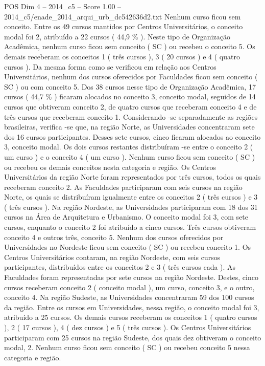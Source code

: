 \begin{textsample}{POS Dim 4 – 2014\_c5 – Score 1.00 – 2014\_c5/enade\_2014\_arqui\_urb\_dc542636d2.txt}
Nenhum curso ficou sem conceito.
Entre os 49 cursos mantidos por Centros Universitários, o conceito modal foi 2, atribuído a 22 cursos ( 44,9 \% ).
Neste tipo de Organização Acadêmica, nenhum curso ficou sem conceito ( SC ) ou recebeu o conceito 5.
Os demais receberam os conceitos 1 ( três cursos ), 3 ( 20 cursos ) e 4 ( quatro cursos ).
Da mesma forma como se verificou em relação aos Centros Universitários, nenhum dos cursos oferecidos por Faculdades ficou sem conceito ( SC ) ou com conceito 5.
Dos 38 cursos nesse tipo de Organização Acadêmica, 17 cursos ( 44,7 \% ) ficaram alocados no conceito 3, conceito modal, seguidos de 14 cursos que obtiveram conceito 2, de quatro cursos que receberam conceito 4 e de três cursos que receberam conceito 1.
Considerando -se separadamente as regiões brasileiras, verifica -se que, na região Norte, as Universidades concentraram sete dos 16 cursos participantes.
Desses sete cursos, cinco ficaram alocados ao conceito 3, conceito modal.
Os dois cursos restantes distribuíram -se entre o conceito 2 ( um curso ) e o conceito 4 ( um curso ).
Nenhum curso ficou sem conceito ( SC ) ou recebeu os demais conceitos nesta categoria e região.
Os Centros Universitários da região Norte foram representados por três cursos, todos os quais receberam conceito 2.
As Faculdades participaram com seis cursos na região Norte, os quais se distribuíram igualmente entre os conceitos 2 ( três cursos ) e 3 ( três cursos ).
Na região Nordeste, as Universidades participaram com 18 dos 31 cursos na Área de Arquitetura e Urbanismo.
O conceito modal foi 3, com sete cursos, enquanto o conceito 2 foi atribuído a cinco cursos.
Três cursos obtiveram conceito 4 e outros três, conceito 5.
Nenhum dos cursos oferecidos por Universidades no Nordeste ficou sem conceito ( SC ) ou recebeu conceito 1.
Os Centros Universitários contaram, na região Nordeste, com seis cursos participantes, distribuídos entre os conceitos 2 e 3 ( três cursos cada ).
As Faculdades foram representadas por sete cursos na região Nordeste.
Destes, cinco cursos receberam conceito 2 ( conceito modal ), um curso, conceito 3, e o outro, conceito 4.
Na região Sudeste, as Universidades concentraram 59 dos 100 cursos da região.
Entre os cursos em Universidades, nessa região, o conceito modal foi 3, atribuído a 25 cursos.
Os demais cursos receberam os conceitos 1 ( quatro cursos ), 2 ( 17 cursos ), 4 ( dez cursos ) e 5 ( três cursos ).
Os Centros Universitários participaram com 25 cursos na região Sudeste, dos quais dez obtiveram o conceito modal, 2.
Nenhum curso ficou sem conceito ( SC ) ou recebeu conceito 5 nessa categoria e região.

\end{textsample}

